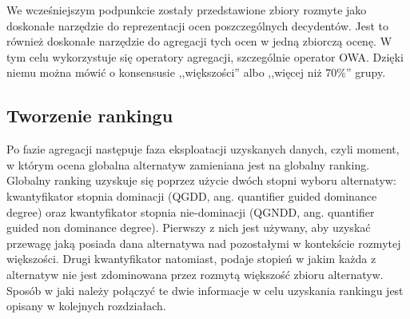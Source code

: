 We wcześniejszym podpunkcie zostały przedstawione zbiory rozmyte jako doskonałe
narzędzie do reprezentacji ocen poszczególnych decydentów. Jest to również
doskonałe narzędzie do agregacji tych ocen w jedną zbiorczą ocenę. W tym celu
wykorzystuje się operatory agregacji, szczególnie operator OWA. Dzięki niemu
można mówić o konsensusie ,,większości'' albo ,,więcej niż $70\%$''
grupy.

\subsection{Tworzenie rankingu}
Po fazie agregacji następuje faza eksploatacji uzyskanych danych, czyli moment,
w którym ocena globalna alternatyw zamieniana jest na globalny ranking. Globalny
ranking uzyskuje się poprzez użycie dwóch stopni wyboru alternatyw:
kwantyfikator stopnia dominacji (QGDD, ang. quantifier guided dominance degree)
oraz kwantyfikator stopnia nie-dominacji (QGNDD, ang. quantifier guided non
dominance degree). Pierwszy z nich jest używany, aby uzyskać przewagę jaką
posiada dana alternatywa nad pozostałymi w kontekście rozmytej większości. Drugi
kwantyfikator natomiast, podaje stopień w jakim każda z alternatyw nie jest
zdominowana przez rozmytą większość zbioru alternatyw. Sposób w jaki należy
połączyć te dwie informacje w celu uzyskania rankingu jest opisany w kolejnych
rozdziałach.
